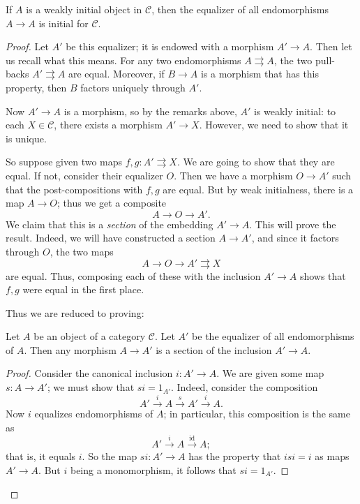 \begin{proposition} \label{weakinitial}
If  $A$ is a weakly initial object in $\mathcal{C}$,
then the equalizer of all endomorphisms $A \to A$ is initial for $\mathcal{C}$.
\end{proposition}
\begin{proof}
Let $A'$ be this equalizer; it is endowed with a morphism $A'\to A$. Then let
us recall what this means. For any two
endomorphisms $A \rightrightarrows A$, the two pull-backs $A'
\rightrightarrows A$ are equal. Moreover, if $B \to A$ is a morphism that has
this property, then $B$ factors uniquely through $A'$.

Now $A' \to A$ is a morphism, so by the remarks above, $A'$ is weakly initial:
to each $X \in \mathcal{C}$, there exists a morphism $A' \to X$.
However, we need to show that it is unique.

So suppose given two maps $f,g: A' \rightrightarrows X$. We are going to show
that they are equal. If not, consider their equalizer $O$.
Then we have a morphism $O \to A'$ such that the post-compositions with $f,g$
are equal. But by weak initialness, there is a map $A \to O$; thus we get a
composite
\[ A \to O \to A'.  \]
We claim that this is a \emph{section} of the embedding $A'\to A$.
This will prove the result. Indeed, we will have constructed a section $A \to
A'$, and since it factors through $O$, the two maps
\[ A \to O \to A' \rightrightarrows X  \]
are equal. Thus, composing each of these with the inclusion $A' \to A$ shows
that $f,g$ were equal in the first place.

Thus we are reduced to proving:
\begin{lemma}
Let $A$ be an object of a category $\mathcal{C}$. Let $A'$ be the equalizer of
all endomorphisms of $A$. Then any morphism $A \to A'$ is a section of the
inclusion $A' \to A$.
\end{lemma}
\begin{proof}
Consider the canonical inclusion $i: A' \to A$. We are given some map $s: A
\to A'$; we must show that $si = 1_{A'}$.
Indeed, consider the composition
\[ A' \stackrel{i}{\to} A \stackrel{s}{\to} A' \stackrel{i}{\to} A .\]
Now $i$ equalizes endomorphisms of $A$; in particular, this composition is the
same as
\[ A' \stackrel{i}{\to} A \stackrel{\mathrm{id}}{\to} A; \]
that is, it equals $i$. So the map $si: A' \to A$ has the property that $isi =
i$ as maps $A' \to A$. But $i$ being a monomorphism, it follows that $si  =
1_{A'}$.
\end{proof}
\end{proof}

